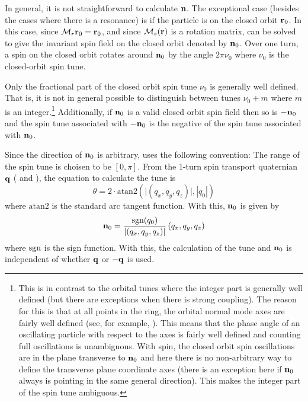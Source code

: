 In general, it is not straightforward to calculate ${\bf n}$. The exceptional case (besides the cases
where there is a resonance) is if the particle is on the closed orbit ${\bf r}_0$. In this case, since
${\cal M}_r {\bf r}_0 = {\bf r}_0$, and since ${\cal M}_s({\bf r})$ is a rotation matrix,  can be solved
to give the invariant spin field on the closed orbit denoted by ${\bf n}_0$.  Over one turn, a spin on
the closed orbit rotates around ${\bf n}_0$ by the angle $2 \pi \nu_0$ where $\nu_0$ is the
closed-orbit spin tune.

Only the fractional part of the closed orbit spin tune $\nu_0$ is generally well defined. That is,
it is not in general possible to distinguish between tunes $\nu_0+m$ where $m$ is an
integer.\footnote
  {
This is in contrast to the orbital tunes where the integer part is generally well defined (but there
are exceptions when there is strong coupling). The reason for this is that at all points in the
ring, the orbital normal mode axes are fairly well defined (see, for example, ). This means
that the phase angle of an oscillating particle with respect to the axes is fairly well defined and
counting full oscillations is unambiguous. With spin, the closed orbit spin oscillations are in the
plane transverse to ${\bf n}_0$ and here there is no non-arbitrary way to define the transverse plane
coordinate axes (there is an exception here if ${\bf n}_0$ always is pointing in the same general
direction). This makes the integer part of the spin tune ambiguous.
  }
Additionally, if ${\bf n}_0$ is a valid closed orbit spin field then so is $-{\bf n}_0$ and the spin tune
associated with $-{\bf n}_0$ is the negative of the spin tune associated with ${\bf n}_0$.

Since the direction of ${\bf n}_0$ is arbitrary, \bmad uses the following convention: The range of the
spin tune is choisen to be $[0, \pi]$. From the 1-turn spin transport quaternian ${\bf q}$ ( and
), the equation to calculate the tune is
\begin{equation}
  \theta = 2 \cdot \text{atan2}\left( \bigl| (q_x, q_y, q_z) \bigr|, |q_0| \right)
\end{equation}
where $\text{atan2}$ is the standard arc tangent function.
With this, ${\bf n}_0$ is given by
\begin{equation}
  {\bf n}_0 = \frac{{\text{sgn}}(q_0)}{\left| (q_x, q_y, q_z) \right|} \, ( q_x, q_y, q_z )
\end{equation}
where ${\text{sgn}}$ is the sign function. With this, the calculation of the tune and ${\bf n}_0$ is
independent of whether ${\bf q}$ or $-{\bf q}$ is used.


